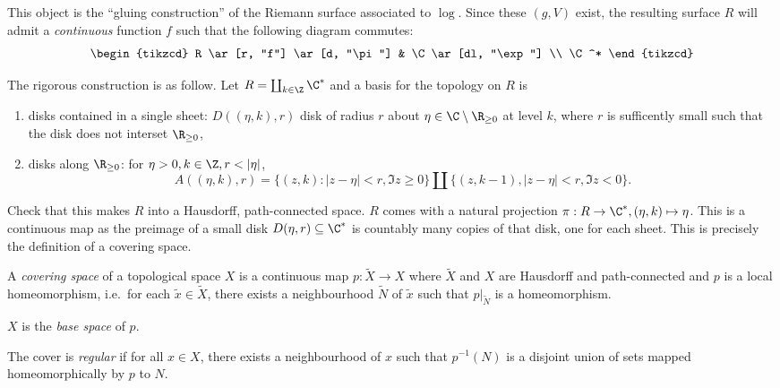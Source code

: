 \documentclass[a4paper]{article}
\begin{document}
\begin{eg}
  This object is the ``gluing construction'' of the Riemann surface associated to \(\log\). Since these \((g, V)\) exist, the resulting surface \(R\) will admit a \emph{continuous} function \(f\) such that the following diagram commutes:
  \[
    \begin{tikzcd}
      R \ar[r, "f"] \ar[d, "\pi"] & \C \ar[dl, "\exp"] \\
      \C^*
    \end{tikzcd}
  \]

  The rigorous construction is as follow. Let \(R = \coprod _{k \in \Z} \C^*\) and a basis for the topology on \(R\) is
  \begin{enumerate}
  \item disks contained in a single sheet: \(D((\eta, k), r)\) disk of radius \(r\) about \(\eta \in \C \setminus \R_{\geq 0}\) at level \(k\), where \(r\) is sufficently small such that the disk does not interset \(\R_{\geq 0}\),
  \item disks along \(\R_{\geq 0}\): for \(\eta > 0, k \in \Z, r < |\eta|\),
    \[
      A((\eta, k), r) = \{(z, k): |z - \eta| < r, \Im z \geq 0\} \amalg \{(z, k - 1), |z - \eta| < r, \Im z < 0\}.
    \]
  \end{enumerate}

Check that this makes \(R\) into a Hausdorff, path-connected space. \(R\) comes with a natural projection \(\pi: R \to \C^*, (\eta, k) \mapsto \eta\). This is a continuous map as the preimage of a small disk \(D(\eta, r) \subseteq \C^*\) is countably many copies of that disk, one for each sheet. This is precisely the definition of a covering space.
\end{eg}

\begin{definition}
  A \emph{covering space} of a topological space \(X\) is a continuous map \(p: \tilde X \to X\) where \(\tilde X\) and \(X\) are Hausdorff and path-connected and \(p\) is a local homeomorphism, i.e.\ for each \(\tilde x \in \tilde X\), there exists a neighbourhood \(\tilde N\) of \(\tilde x\) such that \(p|_{\tilde N}\) is a homeomorphism.

    \(X\) is the \emph{base space} of \(p\).

    The cover is \emph{regular} if for all \(x \in X\), there exists a neighbourhood of \(x\) such that \(p^{-1}(N)\) is a disjoint union of sets mapped homeomorphically by \(p\) to \(N\).
\end{definition}
\end{document}
